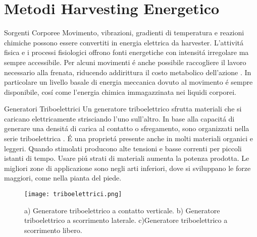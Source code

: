 \chapter{Metodi Harvesting Energetico}

\begin{section}{Sorgenti Corporee}
   Movimento, vibrazioni, gradienti di temperatura e reazioni chimiche possono essere convertiti in energia elettrica da harvester. L'attivit\'a fisica e i processi fisiologici offrono fonti energetiche con intensit\'a irregolare ma sempre accessibile. Per alcuni movimenti \'e anche possibile raccogliere il lavoro necessario alla frenata, riducendo addirittura il costo metabolico dell'azione \cite{liuBiomechanicalEnergyHarvesting2022}. In particolare un livello basale di energia meccanica dovuto al movimento \'e sempre disponibile, cos\'i come l'energia chimica immagazzinata nei liquidi corporei.
   
   \begin{subsection}{Generatori Triboelettrici}
    Un generatore triboelettrico sfrutta materiali che si caricano elettricamente strisciando l'uno sull'altro. In base alla capacit\'a di generare una densit\'a di carica al contatto o sfregamento, sono organizzati nella serie triboelettrica \cite{zouQuantifyingTriboelectricSeries2019}. \'E una propriet\'a presente anche in molti materiali organici e leggeri. Quando stimolati producono alte tensioni e basse correnti per piccoli istanti di tempo. Usare pi\'u strati di materiali aumenta la potenza prodotta. Le migliori zone di applicazione sono negli arti inferiori, dove si sviluppano le forze maggiori, come nella pianta del piede.
    \begin{figure}[H]
        \texttt{[image: triboelettrici.png]}
        \centering
        \caption{a) Generatore triboelettrico a contatto verticale. b) Generatore triboelettrico a scorrimento laterale. c)Generatore triboelettrico a scorrimento libero.}
        \label{fig:triboelettrici}
    \end{figure}
   \end{subsection}


\end{section}
